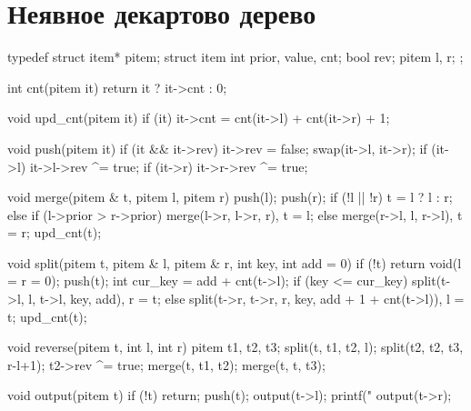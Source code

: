 \documentclass[12pt, titlepage]{article}
\begin{document}
\section{Неявное декартово дерево}
\begin{cppcode}
typedef struct item* pitem;
struct item {
    int prior, value, cnt;
    bool rev;
    pitem l, r;
};

int cnt(pitem it) {
    return it ? it->cnt : 0;
}

void upd_cnt(pitem it) {
    if (it)
        it->cnt = cnt(it->l) + cnt(it->r) + 1;
}

void push(pitem it) {
    if (it && it->rev) {
        it->rev = false;
        swap(it->l, it->r);
        if (it->l)  it->l->rev ^= true;
        if (it->r)  it->r->rev ^= true;
    }
}

void merge(pitem & t, pitem l, pitem r) {
    push(l);
    push(r);
    if (!l || !r)
        t = l ? l : r;
    else if (l->prior > r->prior)
        merge(l->r, l->r, r),  t = l;
    else
        merge(r->l, l, r->l),  t = r;
    upd_cnt(t);
}

void split(pitem t, pitem & l, pitem & r, int key, int add = 0) {
    if (!t)
        return void(l = r = 0);
    push(t);
    int cur_key = add + cnt(t->l);
    if (key <= cur_key)
        split(t->l, l, t->l, key, add),  r = t;
    else
        split(t->r, t->r, r, key, add + 1 + cnt(t->l)),  l = t;
    upd_cnt(t);
}

void reverse(pitem t, int l, int r) {
    pitem t1, t2, t3;
    split(t, t1, t2, l);
    split(t2, t2, t3, r-l+1);
    t2->rev ^= true;
    merge(t, t1, t2);
    merge(t, t, t3);
}

void output(pitem t) {
    if (!t)  return;
    push(t);
    output(t->l);
    printf("%
    output(t->r);
}
\end{cppcode}
\end{document}

